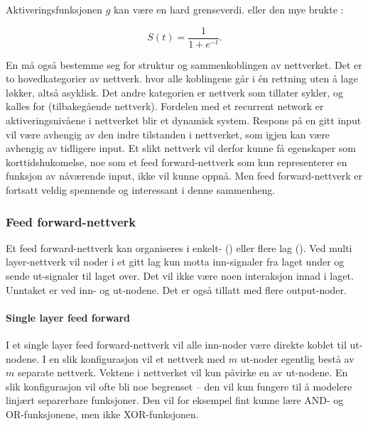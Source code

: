 Aktiveringsfunksjonen $g$ kan være en hard grenseverdi. eller den mye brukte :

\begin{equation}
S(t) = \frac{1}{1+e^{-t}}.
\end{equation}

En må også bestemme seg for struktur og sammenkoblingen av nettverket. Det er to hovedkategorier av nettverk.  hvor alle koblingene går i én rettning uten å lage løkker, altså asyklisk. Det andre kategorien er nettverk som tillater sykler, og kalles for  (tilbakegående nettverk). Fordelen med et recurrent network er aktiveringsnivåene i nettverket blir et dynamisk system. Respons på en gitt input vil være avhengig av den indre tilstanden i nettverket, som igjen kan være avhengig av tidligere input. Et slikt nettverk vil derfor kunne få egenskaper som korttidshukomelse, noe som et feed forward-nettverk som kun representerer en funksjon av nåværende input, ikke vil kunne oppnå. Men feed forward-nettverk er fortsatt veldig spennende og interessant i denne sammenheng.

\subsubsection{Feed forward-nettverk}

Et feed forward-nettverk kan organiseres i enkelt- () eller flere lag (). Ved multi layer-nettverk vil noder i et gitt lag kun motta inn-signaler fra laget under og sende ut-signaler til laget over. Det vil ikke være noen interaksjon innad i laget. Unntaket er ved inn- og ut-nodene. Det er også tillatt med flere output-noder. 

\paragraph{Single layer feed forward} I et single layer feed forward-nettverk vil alle inn-noder være direkte koblet til ut-nodene. I en slik konfigurasjon vil et nettverk med $m$ ut-noder egentlig bestå av $m$ separate nettverk. Vektene i nettverket vil kun påvirke en av ut-nodene. En slik konfigurasjon vil ofte bli noe begrenset -- den vil kun fungere til å modelere linjært separerbare funksjoner. Den vil for eksempel fint kunne lære AND- og OR-funksjonene, men ikke XOR-funksjonen.

